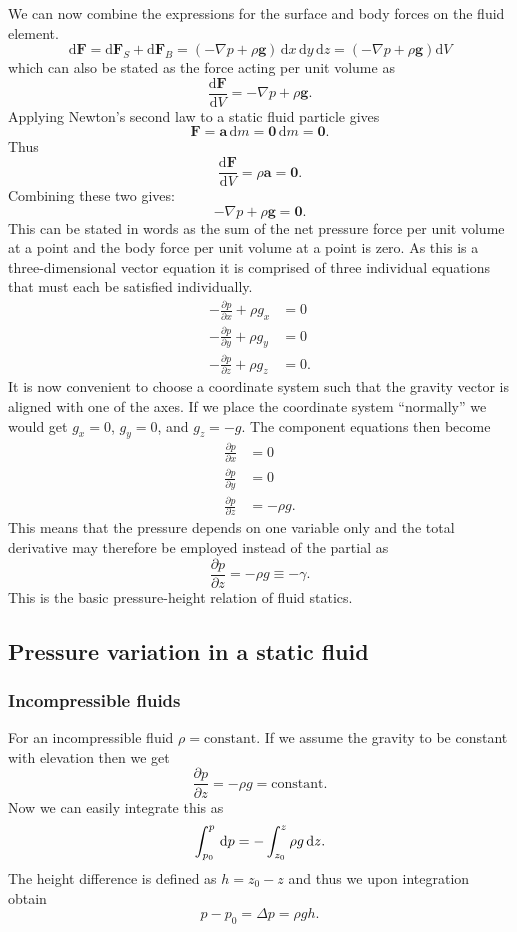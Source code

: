 We can now combine the expressions for the surface and body forces on the fluid element.
\[ 
\mathrm{d}\textbf{F} = \mathrm{d}\textbf{F}_S + \mathrm{d}\textbf{F}_B = \left( - \nabla p + \rho \textbf{g} \right) \, \mathrm{d}x \, \mathrm{d}y \, \mathrm{d}z = \left( - \nabla p + \rho \textbf{g} \right) \mathrm{d}V
\]
which can also be stated as the force acting per unit volume as
\[ 
\frac{\mathrm{d}\textbf{F}}{\mathrm{d}V} = - \nabla p + \rho \textbf{g} 
.\]
Applying Newton's second law to a static fluid particle gives
\[ 
\textbf{F} = \textbf{a} \, \mathrm{d}m = \textbf{0} \, \mathrm{d}m = \textbf{0}
.\]
Thus
\[ 
\frac{\mathrm{d}\textbf{F}}{\mathrm{d}V} = \rho \textbf{a} = \textbf{0} 
.\]
Combining these two gives:
\[ 
- \nabla  p + \rho \textbf{g} = \textbf{0}
.\]
This can be stated in words as the sum of the net pressure force per unit volume at a point and the body force per unit volume at a point is zero. As this is a three-dimensional vector equation it is comprised of three individual equations that must each be satisfied individually.
\begin{align*}
  - \frac{\partial p}{\partial x} + \rho g_x &= 0 \\
  - \frac{\partial p}{\partial y} + \rho g_y &= 0 \\
  - \frac{\partial p}{\partial z} + \rho g_z &= 0
.\end{align*}
It is now convenient to choose a coordinate system such that the gravity vector is aligned with one of the axes. If we place the coordinate system ``normally'' we would get $g_x = 0$, $g_y = 0$, and $g_z = -g$. The component equations then become
\begin{align*}
  \frac{\partial p}{\partial x} &= 0 \\
  \frac{\partial p}{\partial y} &= 0 \\
  \frac{\partial p}{\partial z} &= -\rho g
.\end{align*}
This means that the pressure depends on one variable only and the total derivative may therefore be employed instead of the partial as
\[ 
\frac{\partial p}{\partial z} = - \rho g \equiv -\gamma
.\]
This is the basic pressure-height relation of fluid statics. 

\subsection{Pressure variation in a static fluid}

\subsubsection{Incompressible fluids}
For an incompressible fluid $\rho = \mathrm{constant}$. If we assume the gravity to be constant with elevation then we get
\[ 
\frac{\partial p}{\partial z} = - \rho g = \mathrm{constant}
.\]
Now we can easily integrate this as
\[
  \int_{p_0}^{p} \, \mathrm{d}p = - \int_{z_0}^{z} \rho g \, \mathrm{d}z \\
.\]
The height difference is defined as $h = z_0 - z$ and thus we upon integration obtain
\[ 
p - p_0 = \Delta p = \rho gh
.\]

